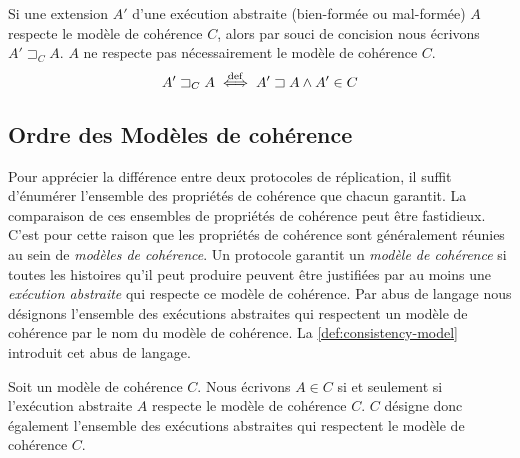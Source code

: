 \begin{definition}\label{def:consistent-extension}
Si une extension $A'$ d'une exécution abstraite (bien-formée ou mal-formée) $A$ respecte le modèle de cohérence $C$, alors par souci de concision nous écrivons $A' \sqsupset_C A$.
$A$ ne respecte pas nécessairement le modèle de cohérence $C$.
\begin{equation*}
A' \sqsupset_C A \overset{\mathrm{def}}{\iff} A' \sqsupset A \land A' \in C
\end{equation*}
\end{definition}



\subsection{Ordre des Modèles de cohérence}\label{subsec:consistency-spec-hier}

Pour apprécier la différence entre deux protocoles de réplication, il suffit d'énumérer l'ensemble des propriétés de cohérence que chacun garantit.
La comparaison de ces ensembles de propriétés de cohérence peut être fastidieux.
C'est pour cette raison que les propriétés de cohérence sont généralement réunies au sein de \emph{modèles de cohérence}.
Un protocole garantit un \emph{modèle de cohérence} si toutes les histoires qu'il peut produire peuvent être justifiées par au moins une \emph{exécution abstraite} qui respecte ce modèle de cohérence.
Par abus de langage nous désignons l'ensemble des exécutions abstraites qui respectent un modèle de cohérence par le nom du modèle de cohérence.
La \autoref{def:consistency-model} introduit cet abus de langage.

\begin{definition}\label{def:consistency-model}
Soit un modèle de cohérence $C$.
Nous écrivons $A \in C$ si et seulement si l'exécution abstraite $A$ respecte le modèle de cohérence $C$.
$C$ désigne donc également l'ensemble des exécutions abstraites qui respectent le modèle de cohérence $C$.
\end{definition}



